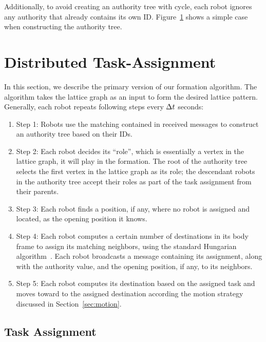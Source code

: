 Additionally, to avoid creating an authority tree with cycle, each robot ignores any authority that already contains its own ID.
%
Figure~\ref{fig:authtree} shows a simple case when constructing the authority tree.
\begin{figure}
  
  \label{fig:authtree}
\end{figure}

\section{Distributed Task-Assignment}
\label{sec:task-assgin-algo}

In this section, we describe the primary version of our formation algorithm. 
%
The algorithm takes the lattice graph as an input to form the desired lattice pattern. 
%
Generally, each robot repeats following steps every $\Delta t$ seconds:
\begin{enumerate}
\item Step 1: Robots use the matching contained in received messages to
  construct an authority tree based on their IDs.
\item Step 2: Each robot decides its ``role'', which is essentially a vertex in the lattice graph, it will play in the formation.  
    The root of the authority tree selects the first vertex in the lattice graph as its role; 
    the descendant robots in the authority tree accept their roles as part of the task assignment from their parents. 
\item Step 3: Each robot finds a position, if any, where no robot is assigned and located, as the opening position it knows.
\item Step 4: Each robot computes a certain number of destinations in its body frame to
  assign its matching neighbors, using the standard Hungarian
  algorithm~\cite{Kuh55}. 
  Each robot broadcasts a message containing its assignment, along with the authority value, and the opening position, if any, to its neighbors.
\item Step 5: Each robot computes its destination based on the assigned task and moves toward to the assigned destination according the motion strategy discussed in Section~\ref{sec:motion}.
\end{enumerate}

\subsection{Task Assignment}
\label{subsec:task}


